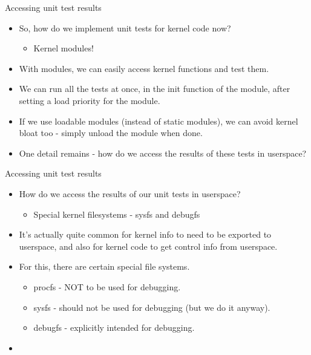 \documentclass{beamer}
\begin{document}
\begin{frame}{Accessing unit test results}

  \begin{itemize}
    \item So, how do we implement unit tests for kernel code now?
      \begin{itemize}
      \item Kernel modules!
      \end{itemize}
    \item With modules, we can easily access kernel functions and test
      them.
    \item We can run all the tests at once, in the init function of
      the module, after setting a load priority for the module.
    \item If we use loadable modules (instead of static modules), we
      can avoid kernel bloat too - simply unload the module when done.
    \item One detail remains - how do we access the results of these
      tests in userspace?
  \end{itemize}

\end{frame}

\begin{frame}{Accessing unit test results}

  \begin{itemize}

  \item How do we access the results of our unit tests in userspace?
    \begin{itemize}
    \item Special kernel filesystems - sysfs and debugfs
    \end{itemize}

  \item It's actually quite common for kernel info to need to be
    exported to userspace, and also for kernel code to get control
    info from userspace.
  \item For this, there are certain special file systems.
    \begin{itemize}
    \item procfs - NOT to be used for debugging.
    \item sysfs - should not be used for debugging (but we do it anyway).
    \item debugfs - explicitly intended for debugging.
    \end{itemize}
  \item 

  \end{itemize}

\end{frame}
\end{document}
